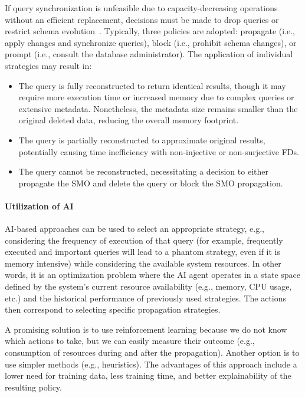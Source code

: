 If query synchronization is unfeasible due to capacity-decreasing operations without an efficient replacement, decisions must be made to drop queries or restrict schema evolution~\citep{10.1145/2903726}. Typically, three policies are adopted: propagate (i.e., apply changes and synchronize queries), block (i.e., prohibit schema changes), or prompt (i.e., consult the database administrator). The application of individual strategies may result in:
\begin{itemize}
    \item The query is fully reconstructed to return identical results, though it may require more execution time or increased memory due to complex queries or extensive metadata. Nonetheless, the metadata size remains smaller than the original deleted data, reducing the overall memory footprint.
    \item The query is partially reconstructed to approximate original results, potentially causing time inefficiency with non-injective or non-surjective FDs.
    \item The query cannot be reconstructed, necessitating a decision to either propagate the SMO and delete the query or block the SMO propagation.
\end{itemize}


\paragraph{Utilization of AI}
AI-based approaches can be used to select an appropriate strategy, e.g., considering the frequency of execution of that query (for example, frequently executed and important queries will lead to a phantom strategy, even if it is memory intensive) while considering the available system resources. 
%
%
In other words, it is an optimization problem where the AI agent operates in a state space defined by the system's current resource availability (e.g., memory, CPU usage, etc.) and the historical performance of previously used strategies. The actions then correspond to selecting specific propagation strategies.

A promising solution is to use reinforcement learning because we do not know which actions to take, but we can easily measure their outcome (e.g., consumption of resources during and after the propagation). Another option is to use simpler methods (e.g., heuristics). The advantages of this approach include a lower need for training data, less training time, and better explainability of the resulting policy. %

